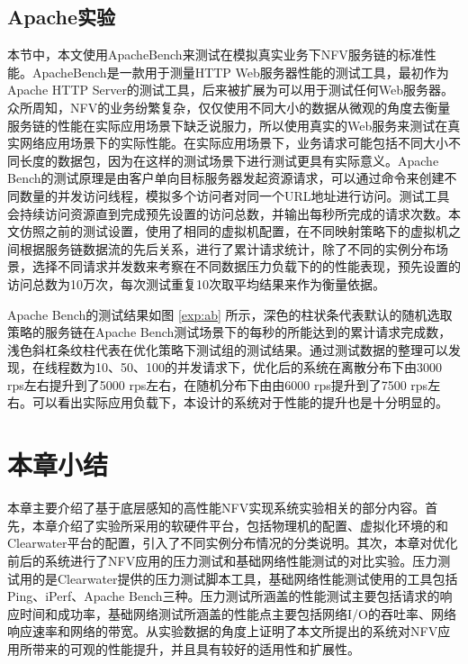\subsection{Apache实验}
本节中，本文使用ApacheBench来测试在模拟真实业务下NFV服务链的标准性能。ApacheBench是一款用于测量HTTP Web服务器性能的测试工具，最初作为Apache HTTP Server的测试工具，后来被扩展为可以用于测试任何Web服务器。众所周知，NFV的业务纷繁复杂，仅仅使用不同大小的数据从微观的角度去衡量服务链的性能在实际应用场景下缺乏说服力，所以使用真实的Web服务来测试在真实网络应用场景下的实际性能。在实际应用场景下，业务请求可能包括不同大小不同长度的数据包，因为在这样的测试场景下进行测试更具有实际意义。Apache Bench的测试原理是由客户单向目标服务器发起资源请求，可以通过命令来创建不同数量的并发访问线程，模拟多个访问者对同一个URL地址进行访问。测试工具会持续访问资源直到完成预先设置的访问总数，并输出每秒所完成的请求次数。本文仿照之前的测试设置，使用了相同的虚拟机配置，在不同映射策略下的虚拟机之间根据服务链数据流的先后关系，进行了累计请求统计，除了不同的实例分布场景，选择不同请求并发数来考察在不同数据压力负载下的的性能表现，预先设置的访问总数为10万次，每次测试重复10次取平均结果来作为衡量依据。
\begin{figure}[!htp]
	\centering
\end{figure}
\begin{figure}
\addtocounter{subfigure}{2}
\ContinuedFloat
\centering
\end{figure}

Apache Bench的测试结果如图 \ref{exp:ab} 所示，深色的柱状条代表默认的随机选取策略的服务链在Apache Bench测试场景下的每秒的所能达到的累计请求完成数，浅色斜杠条纹柱代表在优化策略下测试组的测试结果。通过测试数据的整理可以发现，在线程数为10、50、100的并发请求下，优化后的系统在离散分布下由3000 rps左右提升到了5000 rps左右，在随机分布下由由6000 rps提升到了7500 rps左右。可以看出实际应用负载下，本设计的系统对于性能的提升也是十分明显的。

\newpage
\section{本章小结}
本章主要介绍了基于底层感知的高性能NFV实现系统实验相关的部分内容。首先，本章介绍了实验所采用的软硬件平台，包括物理机的配置、虚拟化环境的和Clearwater平台的配置，引入了不同实例分布情况的分类说明。其次，本章对优化前后的系统进行了NFV应用的压力测试和基础网络性能测试的对比实验。压力测试用的是Clearwater提供的压力测试脚本工具，基础网络性能测试使用的工具包括Ping、iPerf、Apache Bench三种。压力测试所涵盖的性能测试主要包括请求的响应时间和成功率，基础网络测试所涵盖的性能点主要包括网络I/O的吞吐率、网络响应速率和网络的带宽。从实验数据的角度上证明了本文所提出的系统对NFV应用所带来的可观的性能提升，并且具有较好的适用性和扩展性。